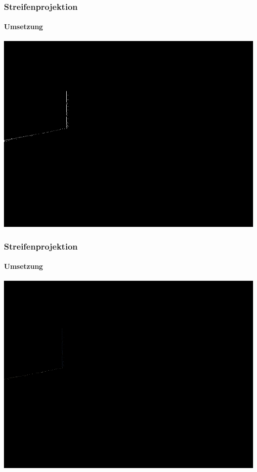 \documentclass{beamer}
\begin{document}
\begin{frame}
	\frametitle{Streifenprojektion}
	\framesubtitle{Umsetzung}

	
	\includegraphics[width=0.9\linewidth]{includes/line.png}

\end{frame}
\begin{frame}
	\frametitle{Streifenprojektion}
	\framesubtitle{Umsetzung}

	
	\includegraphics[width=0.9\linewidth]{includes/3d.png}

\end{frame}
\end{document}
